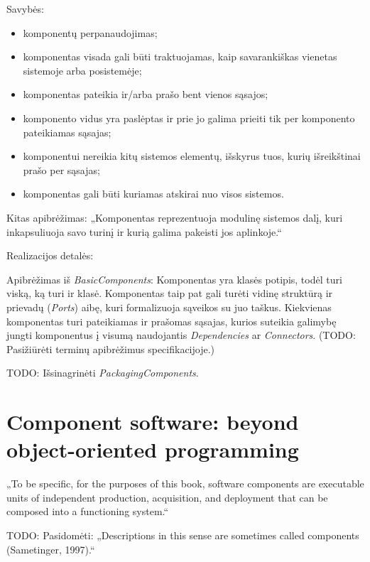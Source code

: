 Savybės:
\begin{itemize}
  \item komponentų perpanaudojimas;
  \item komponentas visada gali būti traktuojamas, kaip savarankiškas
    vienetas sistemoje arba posistemėje;
  \item komponentas pateikia ir/arba prašo bent vienos sąsajos;
  \item komponento vidus yra paslėptas ir prie jo galima prieiti tik
    per komponento pateikiamas sąsajas;
  \item komponentui nereikia kitų sistemos elementų, išskyrus tuos, kurių
    išreikštinai prašo per sąsajas;
  \item komponentas gali būti kuriamas atskirai nuo visos sistemos.
\end{itemize}

Kitas apibrėžimas: „Komponentas reprezentuoja modulinę sistemos dalį, kuri
inkapsuliuoja savo turinį ir kurią galima pakeisti jos aplinkoje.“
\cite[146]{UML-superstructure}

\begin{note}
  Realizacijos detalės:

  Apibrėžimas iš
  \emph{BasicComponents}\cite[146]{UML-superstructure}: Komponentas yra
  klasės potipis, todėl turi viską, ką turi ir klasė.  Komponentas
  taip pat gali turėti vidinę struktūrą ir prievadų (\emph{Ports})
  aibę, kuri formalizuoja sąveikos su juo taškus. Kiekvienas
  komponentas turi pateikiamas ir prašomas sąsajas, kurios suteikia
  galimybę jungti komponentus į visumą naudojantis
  \emph{Dependencies} ar \emph{Connectors}. (TODO: Pasižiūrėti
  terminų apibrėžimus specifikacijoje.)

  TODO: Išsinagrinėti \emph{PackagingComponents}.
\end{note}

\section{Component software: beyond object-oriented programming}

„To be specific, for the purposes of this book, software components
are executable units of independent production, acquisition, and deployment
that can be composed into a functioning system.“ 
\cite[3]{cs-beyond-object-oriented-programming}

TODO: Pasidomėti: „Descriptions in this sense are sometimes called
components (Sametinger, 1997).“%
\cite[3]{cs-beyond-object-oriented-programming}

